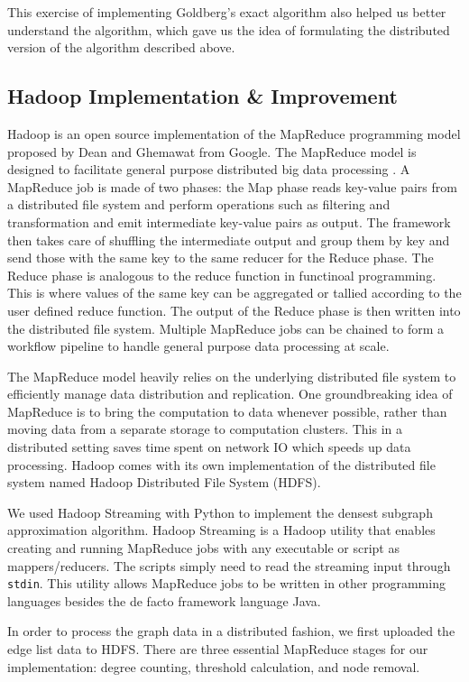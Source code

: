 \documentclass{article}
\begin{document}
This exercise of implementing Goldberg's exact algorithm also helped us better understand the algorithm, which gave us the idea of formulating the distributed version of the algorithm described above.

\subsection{Hadoop Implementation \& Improvement}
Hadoop is an open source implementation of the MapReduce programming model proposed by Dean and Ghemawat from Google. The MapReduce model is designed to facilitate general purpose distributed big data processing \cite{Dean:2004:MSD:1251254.1251264}. A MapReduce job is made of two phases: the Map phase reads key-value pairs from a distributed file system and perform operations such as filtering and transformation and emit intermediate key-value pairs as output. The framework then takes care of shuffling the intermediate output and group them by key and send those with the same key to the same reducer for the Reduce phase. The Reduce phase is analogous to the reduce function in functinoal programming. This is where values of the same key can be aggregated or tallied according to the user defined reduce function. The output of the Reduce phase is then written into the distributed file system. Multiple MapReduce jobs can be chained to form a workflow pipeline to handle general purpose data processing at scale.

The MapReduce model heavily relies on the underlying distributed file system to efficiently manage data distribution and replication. One groundbreaking idea of MapReduce is to bring the computation to data whenever possible, rather than moving data from a separate storage to computation clusters. This in a distributed setting saves time spent on network IO which speeds up data processing. Hadoop comes with its own implementation of the distributed file system named Hadoop Distributed File System (HDFS).

We used Hadoop Streaming with Python to implement the densest subgraph approximation algorithm. Hadoop Streaming is a Hadoop utility that enables creating and running MapReduce jobs with any executable or script as mappers/reducers. The scripts simply need to read the streaming input through \texttt{stdin}. This utility allows MapReduce jobs to be written in other programming languages besides the de facto framework language Java.

In order to process the graph data in a distributed fashion, we first uploaded the edge list data to HDFS. There are three essential MapReduce stages for our implementation: degree counting, threshold calculation, and node removal.
\end{document}

